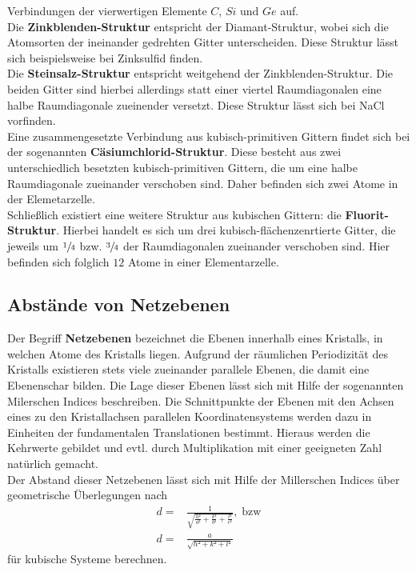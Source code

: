 Verbindungen der vierwertigen Elemente $C$, $Si$ und $Ge$ auf.\\
Die \textbf{Zinkblenden-Struktur} entspricht der Diamant-Struktur, wobei sich die Atomsorten der ineinander gedrehten
Gitter unterscheiden. Diese Struktur lässt sich beispielsweise bei Zinksulfid finden. \\
Die \textbf{Steinsalz-Struktur} entspricht weitgehend der Zinkblenden-Struktur. Die beiden Gitter sind hierbei allerdings
statt einer viertel Raumdiagonalen eine halbe Raumdiagonale zueinender versetzt. Diese Struktur lässt sich bei NaCl
vorfinden.\\
Eine zusammengesetzte Verbindung aus kubisch-primitiven Gittern findet sich bei der sogenannten \textbf{Cäsiumchlorid-Struktur}.
Diese besteht aus zwei unterschiedlich besetzten kubisch-primitiven Gittern, die um eine halbe Raumdiagonale zueinander verschoben
sind. Daher befinden sich zwei Atome in der Elemetarzelle. \\
Schließlich existiert eine weitere Struktur aus kubischen Gittern: die \textbf{Fluorit-Struktur}. Hierbei handelt es sich um drei
kubisch-flächenzenrtierte Gitter, die jeweils um $\sfrac{1}{4}$ bzw. $\sfrac{3}{4}$ der Raumdiagonalen zueinander verschoben sind.
Hier befinden sich folglich $12$ Atome in einer Elementarzelle.
%
\subsection{Abstände von Netzebenen}
%
Der Begriff \textbf{Netzebenen} bezeichnet die Ebenen innerhalb eines Kristalls, in welchen Atome des Kristalls liegen. Aufgrund
der räumlichen Periodizität des Kristalls existieren stets viele zueinander parallele Ebenen, die damit eine Ebenenschar bilden.
Die Lage dieser Ebenen lässt sich mit Hilfe der sogenannten Milerschen Indices beschreiben. Die Schnittpunkte der Ebenen mit den
Achsen eines zu den Kristallachsen parallelen Koordinatensystems werden dazu in Einheiten der fundamentalen Translationen bestimmt.
Hieraus werden die Kehrwerte gebildet und evtl. durch Multiplikation mit einer geeigneten Zahl natürlich gemacht.\\
Der Abstand dieser Netzebenen lässt sich mit Hilfe der Millerschen Indices über geometrische Überlegungen nach
%
\begin{align}
  d=&\frac{1}{\sqrt{\frac{h²}{a²}+\frac{k²}{b²}+\frac{l²}{c²}}}, \; \text{bzw} \\
  d=&\frac{a}{\sqrt{h²+k²+l²}}
  \label{eq:d}
\end{align}
%
für kubische Systeme berechnen.
%
